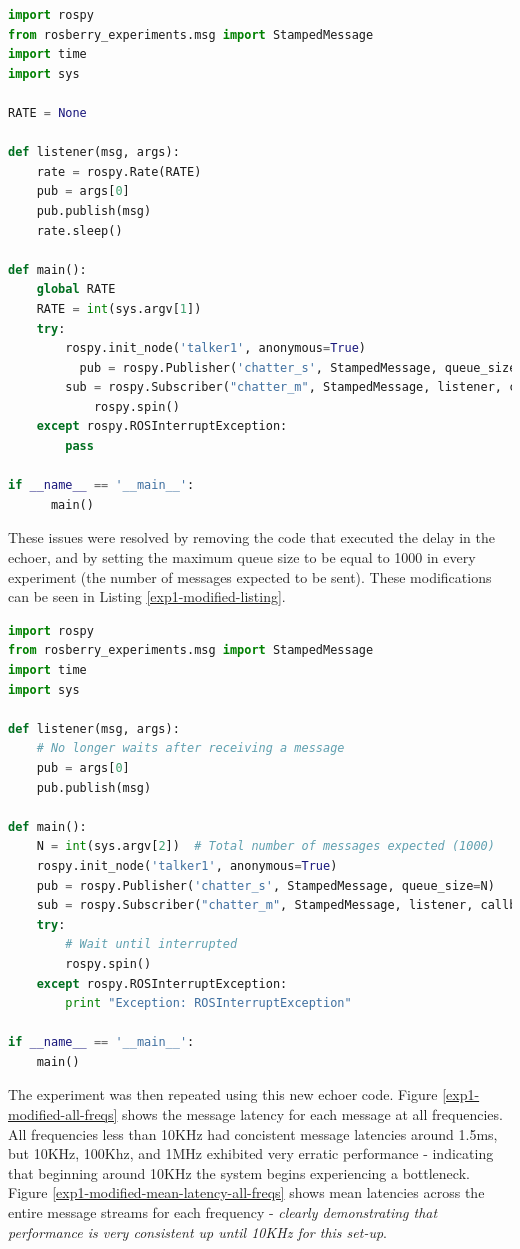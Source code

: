 \documentclass[../dissertation.tex]{subfiles}
\begin{document}
\begin{lstlisting}[language=Python, caption=Echoer Original]
import rospy
from rosberry_experiments.msg import StampedMessage
import time
import sys

RATE = None

def listener(msg, args):
    rate = rospy.Rate(RATE)
    pub = args[0]
    pub.publish(msg)
    rate.sleep()

def main():
    global RATE
    RATE = int(sys.argv[1])
    try:
        rospy.init_node('talker1', anonymous=True)
	      pub = rospy.Publisher('chatter_s', StampedMessage, queue_size=RATE)
        sub = rospy.Subscriber("chatter_m", StampedMessage, listener, callback_args=[pub])
		    rospy.spin()
    except rospy.ROSInterruptException:
        pass

if __name__ == '__main__':
	  main()
\end{lstlisting}

These issues were resolved by removing the code that executed the delay in the echoer, and by setting the maximum queue size to be equal to 1000 in every experiment (the number of messages expected to be sent). These modifications can be seen in Listing \ref{exp1-modified-listing}.

\begin{lstlisting}[language=Python, caption=Echoer Modified, label={exp1-modified-listing}]
import rospy
from rosberry_experiments.msg import StampedMessage
import time
import sys

def listener(msg, args):
    # No longer waits after receiving a message
    pub = args[0]
    pub.publish(msg)

def main():
    N = int(sys.argv[2])  # Total number of messages expected (1000)
    rospy.init_node('talker1', anonymous=True)
    pub = rospy.Publisher('chatter_s', StampedMessage, queue_size=N)
    sub = rospy.Subscriber("chatter_m", StampedMessage, listener, callback_args=[pub])
    try:
        # Wait until interrupted
        rospy.spin()
    except rospy.ROSInterruptException:
        print "Exception: ROSInterruptException"

if __name__ == '__main__':
    main()
\end{lstlisting}

The experiment was then repeated using this new echoer code. Figure \ref{exp1-modified-all-freqs} shows the message latency for each message at all frequencies. All frequencies less than 10KHz had concistent message latencies around 1.5ms, but 10KHz, 100Khz, and 1MHz exhibited very erratic performance - indicating that beginning around 10KHz the system begins experiencing a bottleneck. Figure \ref{exp1-modified-mean-latency-all-freqs} shows mean latencies across the entire message streams for each frequency - \textit{clearly demonstrating that performance is very consistent up until 10KHz for this set-up}.
\end{document}
